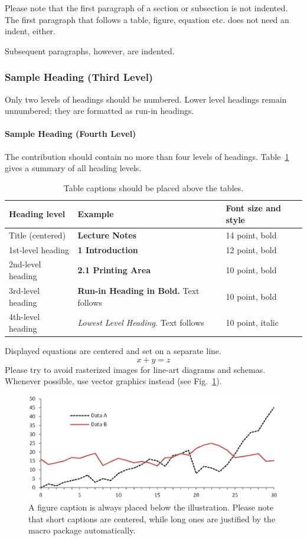 \documentclass{llncs}
\begin{document}
Please note that the first paragraph of a section or subsection is
not indented. The first paragraph that follows a table, figure,
equation etc. does not need an indent, either.

Subsequent paragraphs, however, are indented.

\subsubsection{Sample Heading (Third Level)} Only two levels of
headings should be numbered. Lower level headings remain unnumbered;
they are formatted as run-in headings.

\paragraph{Sample Heading (Fourth Level)}
The contribution should contain no more than four levels of
headings. Table~\ref{tab1} gives a summary of all heading levels.

\begin{table}
\caption{Table captions should be placed above the
tables.}\label{tab1}
\begin{tabular}{|l|l|l|}
\hline
Heading level &  Example & Font size and style\\
\hline
Title (centered) &  {\Large\bfseries Lecture Notes} & 14 point, bold\\
1st-level heading &  {\large\bfseries 1 Introduction} & 12 point, bold\\
2nd-level heading & {\bfseries 2.1 Printing Area} & 10 point, bold\\
3rd-level heading & {\bfseries Run-in Heading in Bold.} Text follows & 10 point, bold\\
4th-level heading & {\itshape Lowest Level Heading.} Text follows & 10 point, italic\\
\hline
\end{tabular}
\end{table}


\noindent Displayed equations are centered and set on a separate
line.
\begin{equation}
x + y = z
\end{equation}
Please try to avoid rasterized images for line-art diagrams and
schemas. Whenever possible, use vector graphics instead (see
Fig.~\ref{fig1}).

\begin{figure}
\includegraphics[width=\textwidth]{fig1.eps}
\caption{A figure caption is always placed below the illustration.
Please note that short captions are centered, while long ones are
justified by the macro package automatically.} \label{fig1}
\end{figure}
\end{document}
